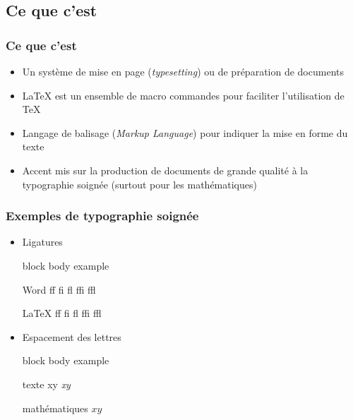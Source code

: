 \documentclass[aspectratio=54,10pt,xcolor=x11names]{beamer}
\renewenvironment{quote}{%
    \begin{beamercolorbox}[wd=\linewidth,sep=6pt]{block body example}}
    {\end{beamercolorbox}}
\theoremstyle{example}
\begin{document}
\subsection{Ce que c'est}

\begin{frame}
  \frametitle{Ce que c'est}
  \begin{itemize}
  \item Un système de mise en page (\emph{typesetting}) ou de préparation de
    documents
  \item {\LaTeX} est un ensemble de macro commandes pour faciliter
    l'utilisation de {\TeX}
  \item Langage de balisage (\emph{Markup Language}) pour indiquer la
    mise en forme du texte
  \item Accent mis sur la production de documents de grande qualité à
    la typographie soignée (surtout pour les mathématiques)
  \end{itemize}
\end{frame}

\begin{frame}
  \frametitle{Exemples de typographie soignée}
  \begin{itemize}
  \item Ligatures
    \begin{quote}
      \begin{minipage}{0.45\linewidth}
        \vspace{-12pt}
        \begin{block}{\small Word}
          \rmfamily f\/f \quad f\/i \quad f\/l \quad f\/f\/i \quad
          f\/f\/l
        \end{block}
      \end{minipage}
      \hfill
      \begin{minipage}{0.4\linewidth}
        \vspace{-12pt}
        \begin{block}{\small \LaTeX}
          \rmfamily ff \quad fi \quad fl \quad ffi \quad ffl
        \end{block}
      \end{minipage}
    \end{quote}
  \item Espacement des lettres
    \begin{quote}
      \begin{minipage}{0.45\linewidth}
        \vspace{-12pt}
        \begin{block}{\small texte}
          \rmfamily xy \quad \emph{xy}
        \end{block}
      \end{minipage}
      \hfill
      \begin{minipage}{0.4\linewidth}
        \vspace{-12pt}
        \begin{block}{\small mathématiques}
          $xy$
        \end{block}
      \end{minipage}
    \end{quote}
  \end{itemize}
\end{frame}
\end{document}
